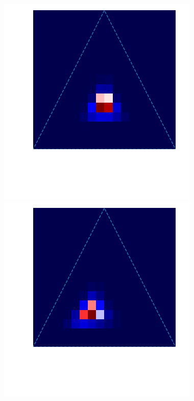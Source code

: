 \begin{figure}
 \begin{minipage}[]{.3\textwidth}
    \includegraphics[width=\textwidth]{triangle_10kld.png}
\subcaption{}
\end{minipage}
 \begin{minipage}{.3\textwidth}
    \includegraphics[width=\textwidth]{triangle_10elbo.png}

\end{minipage}
\end{figure}
